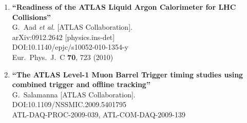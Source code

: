 \documentclass{article}
\begin{document}
\begin{enumerate}
\item%
{\bf ``Readiness of the ATLAS Liquid Argon Calorimeter for LHC Collisions''}
  \\{}G.~Aad {\it et al.} [ATLAS Collaboration].
  \\{}arXiv:0912.2642 [physics.ins-det]
  \\{}DOI:10.1140/epjc/s10052-010-1354-y
  \\{}Eur.\ Phys.\ J.\ C {\bf 70}, 723 (2010)
\item%
{\bf ``The ATLAS Level-1 Muon Barrel Trigger timing studies using combined trigger and offline tracking''}
  \\{}G.~Salamanna [ATLAS Collaboration].
  \\{}DOI:10.1109/NSSMIC.2009.5401795
  \\{}ATL-DAQ-PROC-2009-039, ATL-COM-DAQ-2009-139


\end{enumerate}
\end{document}
